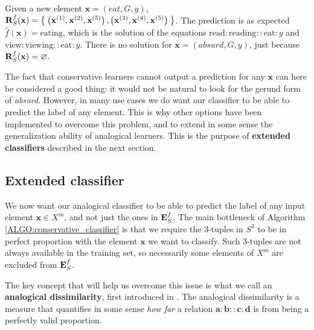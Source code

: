 Given a new element $\mathbf{x}=(eat,G,y)$, $\mathbf{R}_{S}^{f}(\mathbf{x})=
\Set{\left(\mathbf{x}^{(1)}, \mathbf{x}^{(2)}, \mathbf{x}^{(5)}\right),
\left(\mathbf{x}^{(3)},\mathbf{x}^{(4)},\mathbf{x}^{(5)}\right)}$. The
prediction is as expected $\hat{f}(\mathbf{x})=\text{eating}$, which is the
solution of the equations $\text{read}:\text{reading}::\text{eat}:y$ and
$\text{view}:\text{viewing}::\text{eat}:y$. There is
no solution for $\mathbf{x}=(absurd,G,y)$, just because $\mathbf{R}_{S}^{f}(\mathbf{x})= \varnothing$.

The fact that conservative learners cannot output a prediction for any
$\mathbf{x}$ can here be considered a good thing: it would not be natural to
look for the gerund form of \textit{absurd}. However, in many use cases we do
want our classifier to be able to predict the label of any element. This is why
other options have been implemented to overcome this problem, and to extend in
some sense the generalization ability of analogical learners. This is the
purpose of \textbf{extended classifiers} described in the next section.

\subsection{Extended classifier}
\label{SEC:extended_classifier}

We now want our analogical classifier to be able to predict the label of any
input element $\mathbf{x} \in X^m$, and not just the ones in $\mathbf{E}_{S}^{f}$.
The main bottleneck of Algorithm \ref{ALGO:conservative_classifier} is that we
require the 3-tuples in $S^3$ to be in perfect proportion with the element
$\mathbf{x}$ we want to classify. Such 3-tuples are not always available in the
training set, so necessarily some elements of $X^m$ are excluded from $\mathbf{E}_{S}^{f}$.

The key concept that will help us overcome this issue is what we call an
\textbf{analogical dissimilarity}, first introduced in
\cite{BayMicDelIJCAI07}. The analogical dissimilarity is a measure that
quantifies in some sense \textit{how far} a relation $\mathbf{a} : \mathbf{b}
:: \mathbf{c} : \mathbf{d}$ is from being a perfectly valid proportion.

